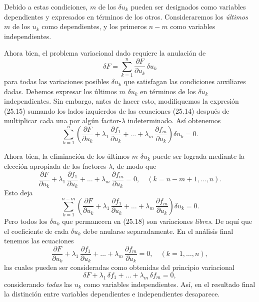 \documentclass[12pt,a4paper]{book}
\begin{document}
Debido a estas condiciones, $m$ de los $\delta u_k$ pueden ser designados como variables dependientes y expresados en términos de los otros. Consideraremos los \textit{últimos} $m$ de los $u_k$ como dependientes, y los primeros $n - m$ como variables independientes.

Ahora bien, el problema variacional dado requiere la anulación de
\begin{equation}
\delta F = \sum_{k=1}^{n} \frac{\partial F}{\partial u_k} \, \delta u_k \tag{25.15}
\end{equation}
para todas las variaciones posibles $\delta u_k$ que satisfagan las condiciones auxiliares dadas. Debemos expresar los últimos $m$ $\delta u_k$ en términos de los $\delta u_k$ independientes. Sin embargo, antes de hacer esto, modifiquemos la expresión (25.15) sumando los lados izquierdos de las ecuaciones (25.14) después de multiplicar cada una por algún factor-$\lambda$ indeterminado. Así obtenemos
\begin{equation}
\sum_{k=1}^{n} \left( \frac{\partial F}{\partial u_k} + \lambda_1 \, \frac{\partial f_1}{\partial u_k} + \ldots + \lambda_m \, \frac{\partial f_m}{\partial u_k} \right) \delta u_k = 0. \tag{25.16}
\end{equation}

Ahora bien, la eliminación de los últimos $m$ $\delta u_k$ puede ser lograda mediante la elección apropiada de los factores-$\lambda$, de modo que
\begin{equation}
\frac{\partial F}{\partial u_k} + \lambda_1 \, \frac{\partial f_1}{\partial u_k} + \ldots + \lambda_m \, \frac{\partial f_m}{\partial u_k} = 0, \quad (k = n - m + 1, \ldots, n). \tag{25.17}
\end{equation}
Esto deja
\begin{equation}
\sum_{k=1}^{n-m} \left( \frac{\partial F}{\partial u_k} + \lambda_1 \, \frac{\partial f_1}{\partial u_k} + \ldots + \lambda_m \, \frac{\partial f_m}{\partial u_k} \right) \delta u_k = 0. \tag{25.18}
\end{equation}
Pero todos los $\delta u_k$ que permanecen en (25.18) son variaciones \textit{libres}. De aquí que el coeficiente de cada $\delta u_k$ debe anularse separadamente. En el análisis final tenemos las ecuaciones
\begin{equation}
\frac{\partial F}{\partial u_k} + \lambda_1 \, \frac{\partial f_1}{\partial u_k} + \ldots + \lambda_m \, \frac{\partial f_m}{\partial u_k} = 0, \quad (k = 1, \ldots, n), \tag{25.19}
\end{equation}
las cuales pueden ser consideradas como obtenidas del principio variacional
\begin{equation}
\delta F + \lambda_1 \, \delta f_1 + \ldots + \lambda_m \, \delta f_m = 0, \tag{25.20}
\end{equation}
considerando \textit{todas} las $u_k$ como variables independientes. Así, en el resultado final la distinción entre variables dependientes e independientes desaparece.
\end{document}
